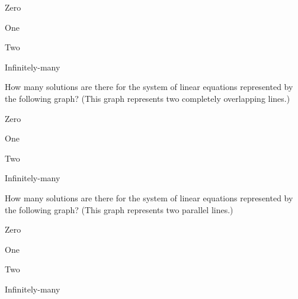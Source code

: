\begin{readinessAssuranceTest}
\begin{multicols}{4}
\begin{readinessAssuranceTestChoices}
\item Zero
\item One
\item Two
\item Infinitely-many
\end{readinessAssuranceTestChoices}
\end{multicols}


\item How many solutions are there for the system of linear equations
      represented by the following graph? (This graph represents two completely
      overlapping lines.)
    \begin{center}
    \end{center}

\begin{multicols}{4}
\begin{readinessAssuranceTestChoices}
\item Zero
\item One
\item Two
\item Infinitely-many
\end{readinessAssuranceTestChoices}
\end{multicols}


\item How many solutions are there for the system of linear equations
      represented by the following graph? (This graph represents two
      parallel lines.)
    \begin{center}
    \end{center}

\begin{multicols}{4}
\begin{readinessAssuranceTestChoices}
\item Zero
\item One
\item Two
\item Infinitely-many
\end{readinessAssuranceTestChoices}
\end{multicols}


\end{readinessAssuranceTest}
